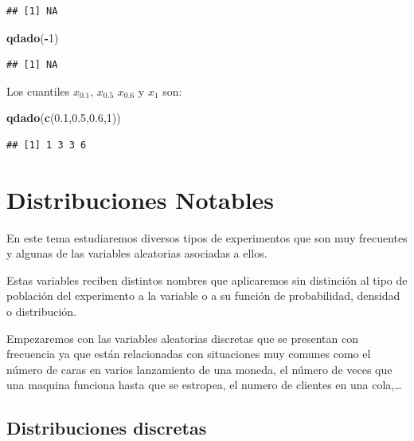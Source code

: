 \documentclass[]{book}
\newenvironment{Shaded}{\begin{snugshade}}{\end{snugshade}}
\newcommand{\DecValTok}[1]{\textcolor[rgb]{0.00,0.00,0.81}{#1}}
\newcommand{\FloatTok}[1]{\textcolor[rgb]{0.00,0.00,0.81}{#1}}
\newcommand{\KeywordTok}[1]{\textcolor[rgb]{0.13,0.29,0.53}{\textbf{#1}}}
\newcommand{\NormalTok}[1]{#1}
\newcommand{\OperatorTok}[1]{\textcolor[rgb]{0.81,0.36,0.00}{\textbf{#1}}}
\begin{document}
\begin{verbatim}
## [1] NA
\end{verbatim}

\begin{Shaded}
\begin{Highlighting}[]
\KeywordTok{qdado}\NormalTok{(}\OperatorTok{-}\DecValTok{1}\NormalTok{)}
\end{Highlighting}
\end{Shaded}

\begin{verbatim}
## [1] NA
\end{verbatim}

Los cuantiles \(x_{0.1}\), \(x_{0.5}\) \(x_{0.6}\) y \(x_1\) son:

\begin{Shaded}
\begin{Highlighting}[]
\KeywordTok{qdado}\NormalTok{(}\KeywordTok{c}\NormalTok{(}\FloatTok{0.1}\NormalTok{,}\FloatTok{0.5}\NormalTok{,}\FloatTok{0.6}\NormalTok{,}\DecValTok{1}\NormalTok{))}
\end{Highlighting}
\end{Shaded}

\begin{verbatim}
## [1] 1 3 3 6
\end{verbatim}

\hypertarget{distribuciones-notables}{%
\chapter{Distribuciones Notables}\label{distribuciones-notables}}

En este tema estudiaremos diversos tipos de experimentos que son muy frecuentes y algunas de las variables aleatorias asociadas a ellos.

Estas variables reciben distintos nombres que aplicaremos sin distinción al tipo de población del experimento a la variable o a su función de probabilidad, densidad o distribución.

Empezaremos con las variables aleatorias discretas que se presentan con frecuencia ya que están relacionadas con situaciones muy comunes como el número de caras en varios lanzamiento de una moneda, el número de veces que una maquina funciona hasta que se estropea, el numero de clientes en una cola,\ldots{}

\hypertarget{distribuciones-discretas}{%
\section{Distribuciones discretas}\label{distribuciones-discretas}}
\end{document}
